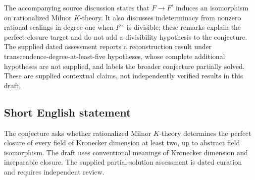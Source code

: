 \documentclass[11pt]{article}
\begin{document}
The accompanying source discussion states that \(F\to F^i\) induces an isomorphism on rationalized Milnor \(K\)-theory. It also discusses indeterminacy from nonzero rational scalings in degree one when \(F^\times\) is divisible; these remarks explain the perfect-closure target and do not add a divisibility hypothesis to the conjecture. The supplied dated assessment reports a reconstruction result under transcendence-degree-at-least-five hypotheses, whose complete additional hypotheses are not supplied, and labels the broader conjecture partially solved. These are supplied contextual claims, not independently verified results in this draft.
\subsection{Short English statement}
The conjecture asks whether rationalized Milnor \(K\)-theory determines the perfect closure of every field of Kronecker dimension at least two, up to abstract field isomorphism. The draft uses conventional meanings of Kronecker dimension and inseparable closure. The supplied partial-solution assessment is dated curation and requires independent review.
\end{document}
